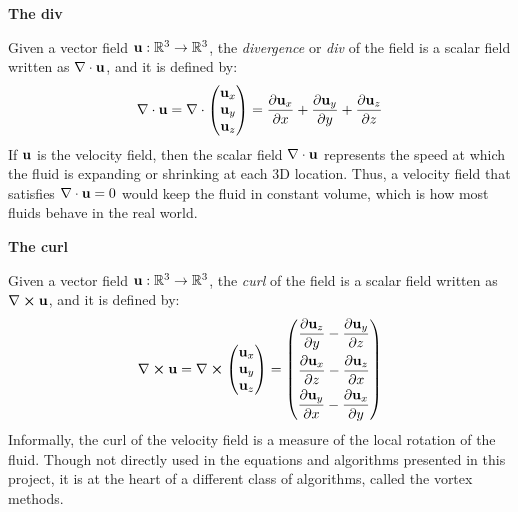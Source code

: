 \gapM

\textbf{The div}

\gapS

Given a vector field $\textbf{u} : \mathbb{R} ^3 \rightarrow \mathbb{R} ^3$, the \textit{divergence} or \textit{div} of the field is a scalar field written as $\nabla \cdot \textbf{u}$, and it is defined by:
$$
    \nabla \cdot \textbf{u} 
    = \nabla \cdot 
    \begin{pmatrix}
        \textbf{u}_x \\
        \textbf{u}_y \\
        \textbf{u}_z
    \end{pmatrix}
    =
    \frac{\partial \textbf{u}_x}{\partial x} +  
    \frac{\partial \textbf{u}_y}{\partial y} +
    \frac{\partial \textbf{u}_z}{\partial z}
$$
If $\textbf{u}$ is the velocity field, then the scalar field $\nabla \cdot \textbf{u}$ represents the speed at which the fluid is expanding or shrinking at each 3D location. Thus, a velocity field that satisfies $\nabla \cdot \textbf{u} = 0$ would keep the fluid in constant volume, which is how most fluids behave in the real world.


\gapM

\textbf{The curl}

\gapS

Given a vector field $\textbf{u} : \mathbb{R} ^3 \rightarrow \mathbb{R} ^3$, the \textit{curl} of the field is a scalar field written as $\nabla \cross \textbf{u}$, and it is defined by:
$$
    \nabla \cross \textbf{u} = 
    \nabla \cross \begin{pmatrix}
        \textbf{u}_x \\
        \textbf{u}_y \\
        \textbf{u}_z
    \end{pmatrix}
    =
    \left(
    \begin{aligned}
        \frac{\partial \textbf{u}_z}{\partial y} - 
            \frac{\partial \textbf{u}_y}{\partial z} \\
        \frac{\partial \textbf{u}_x}{\partial z} - 
            \frac{\partial \textbf{u}_z}{\partial x} \\
        \frac{\partial \textbf{u}_y}{\partial x} - 
            \frac{\partial \textbf{u}_x}{\partial y} \\
    \end{aligned} \right)
$$
Informally, the curl of the velocity field is a measure of the local rotation of the fluid. Though not directly used in the equations and algorithms presented in this project, it is at the heart of a different class of algorithms, called the vortex methods\cite{angelidis2005simulation}.


\gapM

